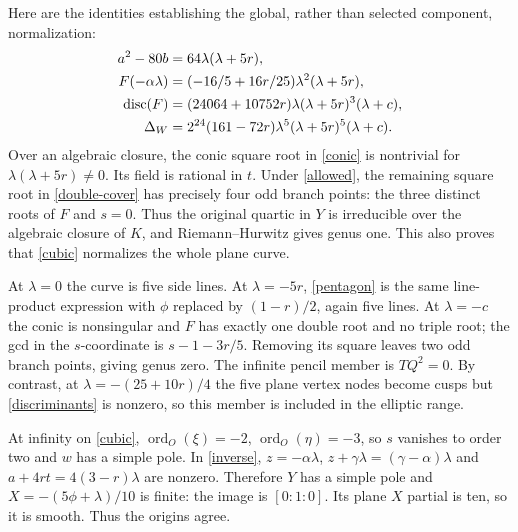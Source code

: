 \documentclass[11pt]{article}
\newcommand{\disc}{\operatorname{disc}}
\newcommand{\ord}{\operatorname{ord}}
\begin{document}
Here are the identities establishing the global, rather than selected
component, normalization:
\begin{align}
a^2-80b&=64\lambda(\lambda+5r),\notag\\
F(-\alpha\lambda)&=(-16/5+16r/25)\lambda^2(\lambda+5r),\notag\\
\disc(F)&=(24064+10752r)\lambda(\lambda+5r)^3(\lambda+c),\notag\\
\Delta_W&=2^{24}(161-72r)\lambda^5(\lambda+5r)^5(\lambda+c).
\label{discriminants}
\end{align}
Over an algebraic closure, the conic square root in \eqref{conic} is
nontrivial for $\lambda(\lambda+5r)\ne0$. Its field is rational in $t$.
Under \eqref{allowed}, the remaining square root in
\eqref{double-cover} has precisely four odd branch points: the three
distinct roots of $F$ and $s=0$. Thus the original quartic in $Y$ is
irreducible over the algebraic closure of $K$, and Riemann--Hurwitz gives
genus one. This also proves that \eqref{cubic} normalizes the whole
plane curve.

At $\lambda=0$ the curve is five side lines. At $\lambda=-5r$,
\eqref{pentagon} is the same line-product expression with $\phi$
replaced by $(1-r)/2$, again five lines. At $\lambda=-c$ the conic is
nonsingular and $F$ has exactly one double root and no triple root; the
gcd in the $s$-coordinate is $s-1-3r/5$. Removing its square leaves two
odd branch points, giving genus zero. The infinite pencil member is
$TQ^2=0$. By contrast, at $\lambda=-(25+10r)/4$ the five plane vertex
nodes become cusps but \eqref{discriminants} is nonzero, so this member
is included in the elliptic range.

At infinity on \eqref{cubic}, $\ord_O(\xi)=-2$, $\ord_O(\eta)=-3$,
so $s$ vanishes to order two and $w$ has a simple pole. In
\eqref{inverse}, $z=-\alpha\lambda$, $z+\gamma\lambda=(\gamma-\alpha)\lambda$
and $a+4rt=4(3-r)\lambda$ are nonzero. Therefore $Y$ has a simple pole
and $X=-(5\phi+\lambda)/10$ is finite: the image is $[0:1:0]$.
Its plane $X$ partial is ten, so it is smooth. Thus the origins agree.
\end{document}
